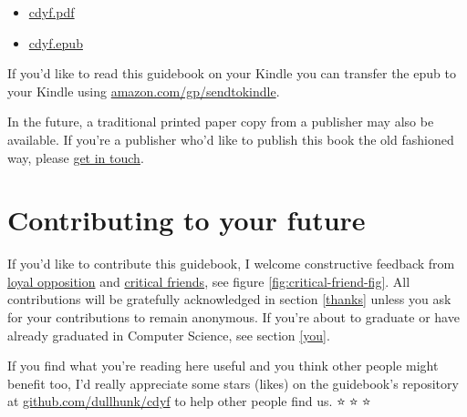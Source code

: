 \documentclass[
]{book}
\providecommand{\tightlist}{%
  \setlength{\itemsep}{0pt}\setlength{\parskip}{0pt}}
\begin{document}
\begin{itemize}
\tightlist
\item
  \href{https://www.cdyf.me/cdyf.pdf}{cdyf.pdf}
\item
  \href{https://www.cdyf.me/cdyf.epub}{cdyf.epub}
\end{itemize}

If you'd like to read this guidebook on your Kindle you can transfer the epub to your Kindle using \href{https://www.amazon.com/gp/sendtokindle}{amazon.com/gp/sendtokindle}.

In the future, a traditional printed paper copy from a publisher may also be available. If you're a publisher who'd like to publish this book the old fashioned way, please \href{https://personalpages.manchester.ac.uk/staff/duncan.hull/contact}{get in touch}.

\hypertarget{contributing}{%
\section{Contributing to your future}\label{contributing}}

If you'd like to contribute this guidebook, I welcome constructive feedback from \href{https://en.wikipedia.org/wiki/Loyal_opposition}{loyal opposition} and \href{https://en.wikipedia.org/wiki/Critical_friend}{critical friends}, see figure \ref{fig:critical-friend-fig}. All contributions will be gratefully acknowledged in section \ref{thanks} unless you ask for your contributions to remain anonymous. If you're about to graduate or have already graduated in Computer Science, see section \ref{you}.

If you find what you're reading here useful and you think other people might benefit too, I'd really appreciate some stars (likes) on the guidebook's repository at \href{https://github.com/dullhunk/cdyf}{github.com/dullhunk/cdyf} to help other people find us. ⭐️🤩⭐️🤩⭐️
\end{document}
